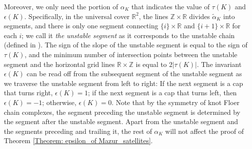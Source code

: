 \documentclass{amsart}
\theoremstyle{definition}
\theoremstyle{remark}
\numberwithin{equation}{section}
\numberwithin{equation}{section} \makeatletter
\begin{document}
Moreover, we only need the portion of $\alpha_K$ that indicates the value of $\tau(K)$ and $\epsilon(K)$. Specifically, in the universal cover $\mathbb{R}^2$, the lines $\mathbb{Z}\times \mathbb{R}$ divides $\tilde{\alpha}_K$ into segments, and there is only one segment connecting $\{i\}\times\mathbb{R}$ and $\{i+1\}\times \mathbb{R}$ for each $i$; we call it \textit{the unstable segment} as it corresponds to the unstable chain (defined in \cite[Theorem 11.26]{LOT18}). The sign of the slope of the unstable segment is equal to the sign of $\tau(K)$, and the minimum number of intersection points between the unstable segment and the horizontal grid lines $\mathbb{R}\times \mathbb{Z}$ is equal to $2|\tau(K)|$. The invariant $\epsilon(K)$ can be read off from the subsequent segment of the unstable segment as we traverse the unstable segment from left to right: If the next segment is a cap that turns right, $\epsilon(K)=1$; if the next segment is a cap that turns left, then $\epsilon(K)=-1$; otherwise, $\epsilon(K)=0$. Note that by the symmetry of knot Floer chain complexes, the segment preceding the unstable segment is determined by the segment after the unstable segment. Apart from the unstable segment and the segments preceding and trailing it, the rest of ${\alpha}_K$ will not affect the proof of Theorem \ref{Theorem: epsilon_of Mazur_satellites}.   
\end{document}
